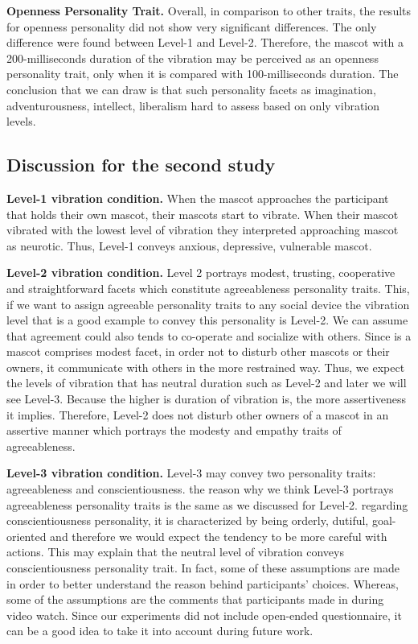 \par \textbf{Openness Personality Trait.} Overall, in comparison to other traits, the results for openness personality did not show very significant differences. The only difference were found between Level-1 and Level-2. Therefore, the mascot with a 200-milliseconds duration of the vibration may be perceived as an openness personality trait, only when it is compared with 100-milliseconds duration. The conclusion that we can draw is that such personality facets as imagination, adventurousness, intellect, liberalism hard to assess based on only vibration levels.

\subsection{Discussion for the second study}
\par \textbf{Level-1 vibration condition.} When the mascot approaches the participant that holds their own mascot, their mascots start to vibrate. When their mascot vibrated with the lowest level of vibration they interpreted approaching mascot as neurotic. Thus, Level-1 conveys anxious, depressive, vulnerable mascot.  
\par \textbf{Level-2 vibration condition.} Level 2 portrays modest, trusting, cooperative and straightforward facets which constitute agreeableness personality traits. This, if we want to assign agreeable personality traits to any social device the vibration level that is a good example to convey this personality is Level-2. We can assume that agreement could also tends to co-operate and socialize with others. Since is a mascot comprises modest facet, in order not to disturb other mascots or their owners, it communicate with others in the more restrained way. Thus, we expect the levels of vibration that has neutral duration such as Level-2 and later we will see Level-3. Because the higher is duration of vibration is, the more assertiveness it implies. Therefore, Level-2 does not disturb other owners of a mascot in an assertive manner which portrays the modesty and empathy traits of agreeableness.
\par \textbf{Level-3 vibration condition.} Level-3 may convey two personality traits: agreeableness and conscientiousness. the reason why we think Level-3 portrays agreeableness personality traits is the same as we discussed for Level-2. regarding conscientiousness personality, it is characterized by being orderly, dutiful, goal-oriented and therefore we would expect the tendency to be more careful with actions. This may explain that the neutral level of vibration conveys conscientiousness personality trait. In fact, some of these assumptions are made in order to better understand the reason behind participants' choices. Whereas, some of the assumptions are the comments that participants made in during video watch. Since our experiments did not include open-ended questionnaire, it can be a good idea to take it into account during future work. 
